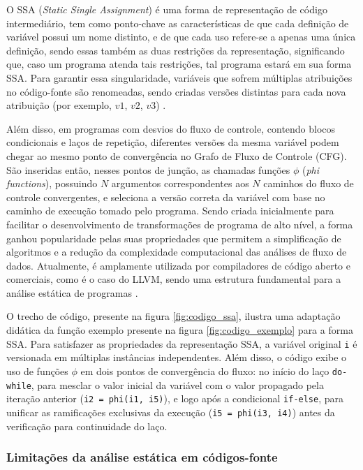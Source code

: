 \documentclass[
    12pt,                %
    openright,           %
    oneside,             %
    a4paper,             %
    english,             %
    brazil               %
]{abntex2}
\begin{document}
O SSA (\textit{Static Single Assignment}) é uma forma de representação de código intermediário, tem como ponto-chave as características de que cada definição de variável possui um nome distinto, e de que cada uso refere-se a apenas uma única definição, 
sendo essas também as duas restrições da representação, significando que, caso um programa atenda tais restrições, tal programa estará em sua forma SSA. Para garantir essa singularidade, variáveis que sofrem múltiplas atribuições no código-fonte são renomeadas, 
sendo criadas versões distintas para cada nova atribuição (por exemplo, $v1$, $v2$, $v3$) \cite{Singer2022}. 

\par
Além disso, em programas com desvios do fluxo de controle, contendo blocos condicionais e laços de repetição, diferentes versões da mesma variável podem chegar ao mesmo ponto de convergência no 
Grafo de Fluxo de Controle (CFG). São inseridas então, nesses pontos de junção, as chamadas funções $\phi$ (\textit{phi functions}), possuindo $N$ argumentos correspondentes aos $N$ caminhos do fluxo de controle convergentes, 
e seleciona a versão correta da variável com base no caminho de execução tomado pelo programa. Sendo criada inicialmente para facilitar o desenvolvimento de transformações de programa de alto nível, 
a forma ganhou popularidade pelas suas propriedades que permitem a simplificação de algoritmos e a redução da complexidade computacional das análises de fluxo de dados. Atualmente, 
é amplamente utilizada por compiladores de código aberto e comerciais, como é o caso do LLVM, sendo uma estrutura fundamental para a análise estática de programas \cite{Singer2022}.

\par
O trecho de código, presente na figura \ref{fig:codigo_ssa}, ilustra uma adaptação didática da função exemplo presente na figura \ref{fig:codigo_exemplo} para a forma SSA. Para satisfazer as propriedades da representação SSA, a variável original \texttt{i} é 
versionada em múltiplas instâncias independentes. Além disso, o código exibe o uso de funções $\phi$ em dois pontos de convergência do fluxo: no início do laço \texttt{do-while}, para mesclar o valor inicial da variável com o valor propagado pela iteração anterior (\texttt{i2 = phi(i1, i5)}), 
e logo após a condicional \texttt{if-else}, para unificar as ramificações exclusivas da execução (\texttt{i5 = phi(i3, i4)}) antes da verificação para continuidade do laço.

\subsubsection{Limitações da análise estática em códigos-fonte}
\end{document}

